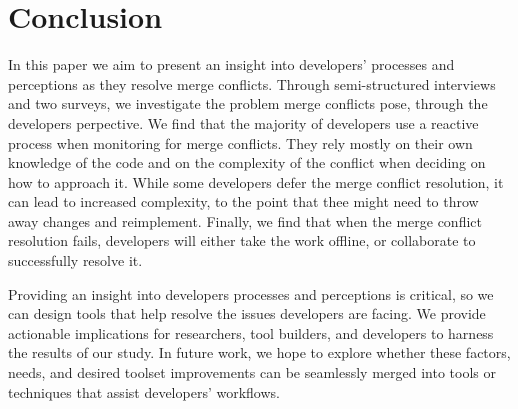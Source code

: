 \section{Conclusion}\label{conclusion}

In this paper we aim to present an insight into developers' processes and perceptions as they resolve merge conflicts.
Through semi-structured interviews and two surveys, we investigate the problem merge conflicts pose, through the developers perpective.
We find that the majority of developers use a reactive process when monitoring for merge conflicts.
They rely mostly on their own knowledge of the code and on the complexity of the conflict when deciding on how to approach it.
While some developers defer the merge conflict resolution, it can lead to increased complexity, to the point that thee might need to throw away changes and reimplement.
Finally, we find that when the merge conflict resolution fails, developers will either take the work offline, or collaborate to successfully resolve it. 

Providing an insight into developers processes and perceptions is critical, so we can design tools that help resolve the issues developers are facing.
We provide actionable implications for researchers, tool builders, and developers to harness the results of our study.
In future work, we hope to explore whether these factors, needs, and desired toolset improvements can be seamlessly merged into tools or techniques that assist developers' workflows.

%
%
